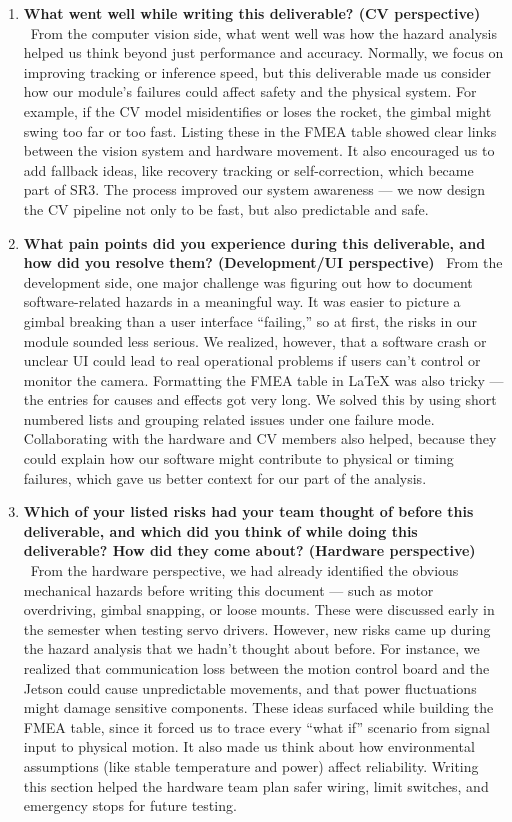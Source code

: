 \documentclass{article}
\begin{document}
\begin{enumerate}
\item \textbf{What went well while writing this deliverable? (CV perspective)} \
From the computer vision side, what went well was how the hazard analysis helped us think beyond just performance and accuracy. Normally, we focus on improving tracking or inference speed, but this deliverable made us consider how our module’s failures could affect safety and the physical system. For example, if the CV model misidentifies or loses the rocket, the gimbal might swing too far or too fast. Listing these in the FMEA table showed clear links between the vision system and hardware movement. It also encouraged us to add fallback ideas, like recovery tracking or self-correction, which became part of SR3. The process improved our system awareness — we now design the CV pipeline not only to be fast, but also predictable and safe.

\item \textbf{What pain points did you experience during this deliverable, and how did you resolve them? (Development/UI perspective)} \
From the development side, one major challenge was figuring out how to document software-related hazards in a meaningful way. It was easier to picture a gimbal breaking than a user interface “failing,” so at first, the risks in our module sounded less serious. We realized, however, that a software crash or unclear UI could lead to real operational problems if users can’t control or monitor the camera. Formatting the FMEA table in LaTeX was also tricky — the entries for causes and effects got very long. We solved this by using short numbered lists and grouping related issues under one failure mode. Collaborating with the hardware and CV members also helped, because they could explain how our software might contribute to physical or timing failures, which gave us better context for our part of the analysis.

\item \textbf{Which of your listed risks had your team thought of before this deliverable, and which did you think of while doing this deliverable? How did they come about? (Hardware perspective)} \
From the hardware perspective, we had already identified the obvious mechanical hazards before writing this document — such as motor overdriving, gimbal snapping, or loose mounts. These were discussed early in the semester when testing servo drivers. However, new risks came up during the hazard analysis that we hadn’t thought about before. For instance, we realized that communication loss between the motion control board and the Jetson could cause unpredictable movements, and that power fluctuations might damage sensitive components. These ideas surfaced while building the FMEA table, since it forced us to trace every “what if” scenario from signal input to physical motion. It also made us think about how environmental assumptions (like stable temperature and power) affect reliability. Writing this section helped the hardware team plan safer wiring, limit switches, and emergency stops for future testing.


\end{enumerate}
\end{document}
